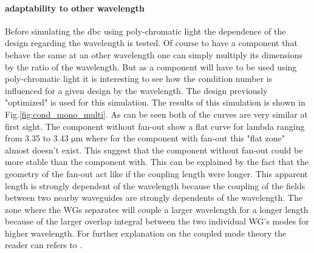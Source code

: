 \paragraph{adaptability to other wavelength}
Before simulating the \gls{dbc} using poly-chromatic light the dependence of the design regarding the wavelength is tested. Of course to have a component that behave the same at an other wavelength one can simply multiply its dimensions by the ratio of the wavelength. But as a component will have to be used using poly-chromatic light it is interesting to see how the condition number is influenced for a given design by the wavelength. The design previously "optimized" is used for this simulation. The results of this simulation is shown in Fig.\ref{fig:cond_mono_multi}. As can be seen both of the curves are very similar at first sight. The component without fan-out show a flat curve for lambda ranging from 3.35 to 3.43 $\si{\micro\meter}$ where for the component with fan-out this "flat zone" almost doesn't exist. This suggest that the component without fan-out could be more stable than the component with. This can be explained by the fact that the geometry of the fan-out act like if the coupling length were longer. This apparent length is strongly dependent of the wavelength because the coupling of the fields between two nearby waveguides are strongly dependents of the wavelength. The zone where the WGs separates will couple a larger wavelength for a longer length because of the larger overlap integral between the two  individual WG's modes for higher wavelength. For further explanation on the coupled mode theory the reader can refers to \cite{saleh_teich, marcuse}.


